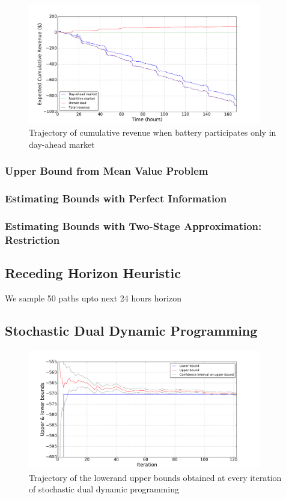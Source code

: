 \documentclass[11pt,twoside]{article}
\begin{document}
\begin{figure}[h!]
\begin{center}
\includegraphics[width=4in]
{Figures/Plots/onlydam/cumulative_rev_fp_st.pdf} \caption{Trajectory of cumulative revenue when battery participates only in day-ahead market}\label{fig:cumulative_rev_onlydam}\end{center}
\end{figure}


\subsubsection{Upper Bound from Mean Value Problem}


\subsubsection{Estimating Bounds with Perfect Information}
\subsubsection{Estimating Bounds with Two-Stage 	Approximation: Restriction}
\subsection{Receding Horizon Heuristic}
We sample 50 paths upto next 24 hours horizon 
\subsection{Stochastic Dual Dynamic Programming}
\begin{figure}[h!]
\begin{center}
\includegraphics[width=4in]
{Figures/Plots/dualdynamic/bounds.pdf} \caption{Trajectory of the lowerand upper bounds obtained at every iteration of stochastic dual dynamic programming}\label{fig:bounds}\end{center}
\end{figure}
\end{document}
